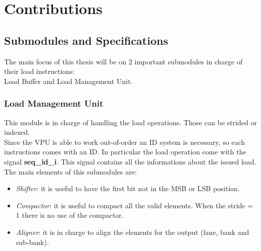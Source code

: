 \chapter{Contributions}
\section{Submodules and Specifications}


The main focus of this thesis will be on 2 important submodules in charge of their load instructions:\\

Load Buffer and Load Management Unit.

\subsection{Load Management Unit}


This module is in charge of handling the load operations.
Those can be strided or indexed.\\

Since the VPU is able to work out-of-order an ID system is necessary, so each instructions comes with an ID. In particular the load operation come with the signal \textbf{seq\_id\_i}.
This signal contains all the informations about the issued load.\\

The main elements of this submodules are:
\begin{itemize}
    \item \textit{Shifter}: it is useful to have the first bit not in the MSB or LSB position.
    
    \item \textit{Compactor}: it is useful to compact all the valid elements. When the stride = 1 there is no use of the compactor.
    
    \item \textit{Aligner}: it is in charge to align the elements for the output (lane, bank and sub-bank).
\end{itemize}

\bigskip

